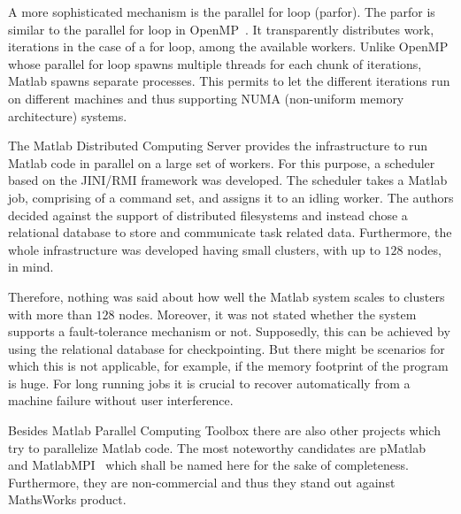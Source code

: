 A more sophisticated mechanism is the parallel for loop (parfor).
The parfor is similar to the parallel for loop in OpenMP~\cite{dagum:csei1998a}.
It transparently distributes work, iterations in the case of a for loop, among the available workers.
Unlike OpenMP whose parallel for loop spawns multiple threads for each chunk of iterations, Matlab spawns separate processes.
This permits to let the different iterations run on different machines and thus supporting NUMA (non-uniform memory architecture) systems.

The Matlab Distributed Computing Server provides the infrastructure to run Matlab code in parallel on a large set of workers.
For this purpose, a scheduler based on the JINI/RMI framework was developed.
The scheduler takes a Matlab job, comprising of a command set, and assigns it to an idling worker.
The authors decided against the support of distributed filesystems and instead chose a relational database to store and communicate task related data.
Furthermore, the whole infrastructure was developed having small clusters, with up to $128$ nodes, in mind.

Therefore, nothing was said about how well the Matlab system scales to clusters with more than $128$ nodes.
Moreover, it was not stated whether the system supports a fault-tolerance mechanism or not.
Supposedly, this can be achieved by using the relational database for checkpointing.
But there might be scenarios for which this is not applicable, for example, if the memory footprint of the program is huge.
For long running jobs it is crucial to recover automatically from a machine failure without user interference.

Besides Matlab Parallel Computing Toolbox there are also other projects which try to parallelize Matlab code.
The most noteworthy candidates are pMatlab~\cite{bliss:ijhpca2007a} and MatlabMPI~\cite{kepner:jpdc2004a} which shall be named here for the sake of completeness.
Furthermore, they are non-commercial and thus they stand out against MathsWorks product.
